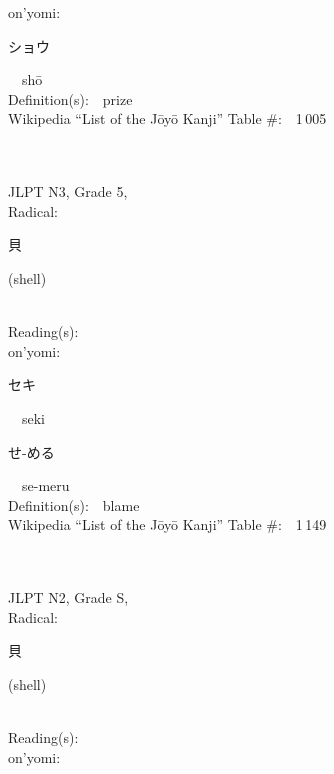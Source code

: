 \begin{multicols}{2}
{\hspace*{1em}}on'yomi:\ \ \\
{\hspace*{2em}}{\begin{CJK}{UTF8}{min} ショウ \end{CJK}}\ \ sh\=o\ \ \\
Definition(s):\ \ prize \\
Wikipedia ``List of the J\=oy\=o Kanji'' Table \#:\ \ 1\,005 \\
\ \ \\
{\fontsize{34pt}{40pt}  }\ \ \\  %
{JLPT N3, Grade 5, \\Radical:\ \ {\begin{CJK}{UTF8}{min} 貝 \end{CJK}} (shell) } \\
Reading(s):\ \ \\
{\hspace*{1em}}on'yomi:\ \ \\
{\hspace*{2em}}{\begin{CJK}{UTF8}{min} セキ \end{CJK}}\ \ seki\ \ \\
{\hspace*{2em}}{\begin{CJK}{UTF8}{min} せ-める \end{CJK}}\ \ se-meru\ \ \\
Definition(s):\ \ blame \\
Wikipedia ``List of the J\=oy\=o Kanji'' Table \#:\ \ 1\,149 \\
\ \ \\
{\fontsize{34pt}{40pt}  }\ \ \\  %
{JLPT N2, Grade S, \\Radical:\ \ {\begin{CJK}{UTF8}{min} 貝 \end{CJK}} (shell) } \\
Reading(s):\ \ \\
{\hspace*{1em}}on'yomi:\ \ \\

\end{multicols}
